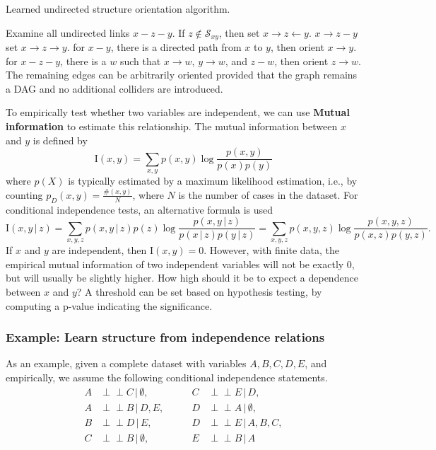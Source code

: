 \documentclass{article}
\newcommand{\giv}{\,|\,}
\newcommand{\indep}{\perp \!\!\! \perp}
\begin{document}
\begin{algorithm}
\caption{Learned undirected structure orientation algorithm. }\label{alg:OR}
\begin{algorithmic}[1]
 Examine all undirected links $x - z - y$. If $z \notin \mathcal{S}_{xy}$, then set $x \rightarrow z \leftarrow y$.  
\Repeat
     $x \rightarrow z - y$ set $x \rightarrow z \rightarrow y$.
     for $x - y$, there is a directed path from $x$ to $y$, then orient $x \rightarrow y$. 
     for $x - z - y$, there is a $w$ such that $x \rightarrow w$, $y \rightarrow w$, and $z - w$, then orient $z \rightarrow w$. 
\State The remaining edges can be arbitrarily oriented provided that the graph remains a DAG and no additional colliders are introduced. 
\end{algorithmic}
\end{algorithm}

\noindent To empirically test whether two variables are independent, we can use \textbf{Mutual information} to estimate this relationship. The mutual information between $x$ and $y$ is defined by
$$
    \mathrm{I}(x, y) = \sum_{x, y} p(x, y) \log \frac{p(x, y)}{p(x) p(y)}
$$
\noindent where $p(X)$ is typically estimated by a maximum likelihood estimation, i.e., by counting $p_D(x, y) = \frac{\#(x, y)}{N}$, where $N$ is the number of cases in the dataset. For conditional independence tests, an alternative formula is used
$$
    \mathrm{I}(x, y \giv z) = \sum_{x, y, z} p(x, y \giv z) p(z) \log \frac{p(x, y \giv z)}{p(x \giv z) p(y \giv z)} = \sum_{x, y, z} p(x, y, z) \log \frac{p(x, y, z)}{p(x, z) p(y, z)}.
$$
\noindent If $x$ and $y$ are independent, then $\mathrm{I}(x, y) = 0$. However, with finite data, the empirical mutual information of two independent variables will not be exactly 0, but will usually be slightly higher. How high should it be to expect a dependence between $x$ and $y$? A threshold can be set based on hypothesis testing, by computing a p-value indicating the significance. 

\subsubsection{Example: Learn structure from independence relations}

As an example, given a complete dataset with variables $A, B, C, D, E$, and empirically, we assume the following conditional independence statements. 
\begin{align*}
    A &\indep C \giv \emptyset, \qquad& C &\indep E \giv D,\\
    A &\indep B \giv D, E, \qquad& D &\indep A \giv \emptyset,\\
    B &\indep D \giv E, \qquad& D &\indep E \giv A, B, C,\\
    C &\indep B \giv \emptyset, \qquad& E &\indep B \giv A
\end{align*}
\end{document}
